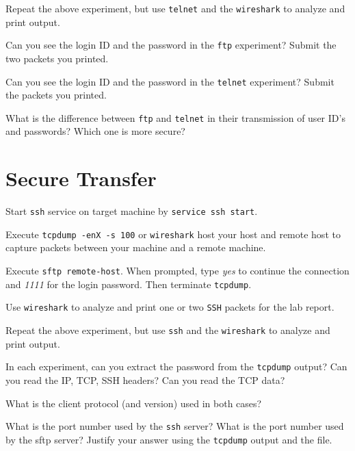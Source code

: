 \documentclass{../UTNetLab}
\begin{document}
    Repeat the above experiment, but use \lstinline{telnet} and the \lstinline{wireshark} to analyze and print output.

    \begin{report}
    \item Can you see the login ID and the password in the \lstinline{ftp} experiment? Submit the two packets you printed.
    
    \item Can you see the login ID and the password in the \lstinline{telnet} experiment? Submit the packets you printed.
    
    \item What is the difference between \lstinline{ftp} and \lstinline{telnet} in their transmission of user ID’s and passwords? Which one is more secure?
    \end{report}

\section{Secure Transfer}
    Start \lstinline{ssh} service on target machine by \lstinline{service ssh start}.
    
    Execute \lstinline{tcpdump -enX -s 100} or \lstinline{wireshark} host your host and remote host to capture packets between your machine and a remote machine.

    Execute \lstinline[emph={your-host, remote-host}]{sftp remote-host}.
    When prompted, type \textit{yes} to continue the connection and \textit{1111} for the login password.
    Then terminate \lstinline{tcpdump}.

    Use \lstinline{wireshark} to analyze and print one or two \lstinline{SSH} packets for the lab report.

    Repeat the above experiment, but use \lstinline{ssh} and the \lstinline{wireshark} to analyze and print output.

    \begin{report}
    \item In each experiment, can you extract the password from the \lstinline{tcpdump} output?
    Can you read the IP, TCP, SSH headers?
    Can you read the TCP data?
    
    \item What is the client protocol (and version) used in both cases?
    
    \item What is the port number used by the \lstinline{ssh} server?
    What is the port number used by the sftp server? Justify your answer using the \lstinline{tcpdump} output and the  file.
    \end{report}
\end{document}
